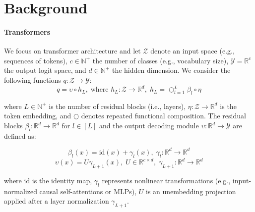 
\section{Background}\label{sec:method_background}



\paragraph{Transformers} 
We focus on transformer architecture and let $\mathcal{Z}$ denote an input space (e.g., sequences of tokens), $c \in \mathbb{N}^+$ the number of classes (e.g., vocabulary size), $\mathcal{Y} = \mathbb{R}^c$ the output logit space, and $d \in \mathbb{N}^+$ the hidden dimension. We consider the following functions $q: \mathcal{Z} \to \mathcal{Y}$:
\begin{equation}
q = \upsilon \circ h_L, \; \text{where }h_L: \mathcal{Z} \to \mathbb{R}^d, \; h_L = \bigcirc_{l=1}^L \beta_l \circ \eta
\label{eq:q_function}
\end{equation}

where $L \in \mathbb{N}^+$ is the number of residual blocks (i.e., layers), $\eta: \mathcal{Z} \to \mathbb{R}^d$ is the token embedding, and $\bigcirc$ denotes repeated functional composition. The residual blocks $\beta_l: \mathbb{R}^d \to \mathbb{R}^d $ for $l \in [L]$ and the output decoding module $\upsilon: \mathbb{R}^d \to \mathcal{Y}$ are defined as:

\vspace{-0.5cm}
\begin{equation}
\beta_l(x) = \mathrm{id}(x) + \gamma_l(x), \; \gamma_l: \mathbb{R}^d \to \mathbb{R}^d
\label{eq:residual_blocks}
\end{equation}
\vspace{-0.5cm}
\begin{equation}
\upsilon(x) = U \gamma_{L+1}(x), \; U \in \mathbb{R}^{c \times d}, \; \gamma_{L+1}: \mathbb{R}^d \to \mathbb{R}^d
\label{eq:decoder}
\end{equation}

where $\mathrm{id}$ is the identity map, $\gamma_l$ represents nonlinear transformations (e.g., input-normalized causal self-attentions or MLPs), $U$ is an unembedding projection applied after a layer normalization $\gamma_{L+1}$. 

